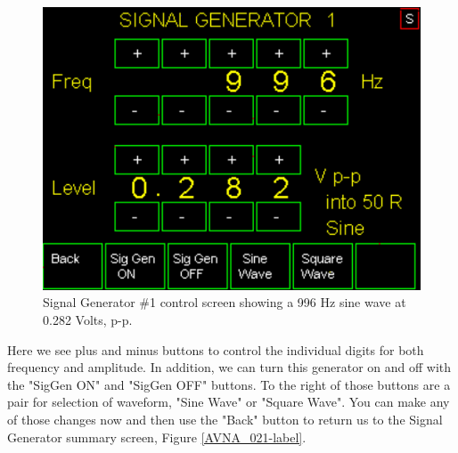 \begin{figure}[H]
\begin{center}
\includegraphics[scale=0.75]{./images/AVNA_022.pdf}
\caption{Signal Generator \#1 control screen  showing a 996 Hz sine wave at 0.282 Volts, p-p.  }
\label{AVNA_022-label}
\end{center}
\end{figure}
%
Here we see plus and minus buttons to control the individual digits for both frequency and amplitude.  In addition, we can turn this generator on and off with the "\textsf{SigGen ON}" and "\textsf{SigGen OFF}" buttons.  To the right of those buttons are a pair for selection of waveform, "\textsf{Sine Wave}" or "\textsf{Square Wave}".  You can make any of those changes now and then use the "\textsf{Back}" button to return us to the Signal Generator summary screen, Figure \ref{AVNA_021-label}.

